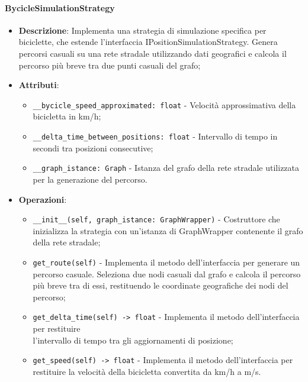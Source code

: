 \documentclass[10pt]{article}
\begin{document}
    \paragraph{BycicleSimulationStrategy}
    \begin{itemize} 
    \item \textbf{Descrizione}: Implementa una strategia di simulazione specifica per biciclette, che estende l'interfaccia IPositionSimulationStrategy. Genera percorsi casuali su una rete stradale utilizzando dati geografici e calcola il percorso più breve tra due punti casuali del grafo;
    \item \textbf{Attributi}:
    \begin{itemize}
        \item \texttt{\_\_bycicle\_speed\_approximated: float} - Velocità approssimativa della bicicletta in km/h;
        \item \texttt{\_\_delta\_time\_between\_positions: float} - Intervallo di tempo in secondi tra posizioni consecutive;
        \item \texttt{\_\_graph\_istance: Graph} - Istanza del grafo della rete stradale utilizzata per la generazione del percorso.
    \end{itemize}
    
    \item \textbf{Operazioni}:
    \begin{itemize}
        \item \texttt{\_\_init\_\_(self, graph\_istance: GraphWrapper)} - Costruttore che inizializza la strategia con un'istanza di GraphWrapper contenente il grafo della rete stradale;
        
        \item \texttt{get\_route(self)} - Implementa il metodo dell'interfaccia per generare un percorso casuale. Seleziona due nodi casuali dal grafo e calcola il percorso più breve tra di essi, restituendo le coordinate geografiche dei nodi del percorso;
        
        \item \texttt{get\_delta\_time(self) -> float} - Implementa il metodo dell'interfaccia per restituire\\ l'intervallo di tempo tra gli aggiornamenti di posizione;
        
        \item \texttt{get\_speed(self) -> float} - Implementa il metodo dell'interfaccia per restituire la velocità della bicicletta convertita da km/h a m/s.
    \end{itemize}
    \end{itemize}
\end{document}
